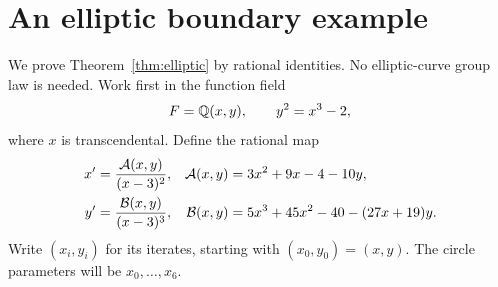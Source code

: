 \section{An elliptic boundary example}\label{sec:elliptic}

We prove Theorem~\ref{thm:elliptic} by rational identities. No
elliptic-curve group law is needed. Work first in the function field
\[
 F=\mathbb Q(x,y),\qquad y^2=x^3-2,
\]
where $x$ is transcendental. Define the rational map
\begin{equation}\label{eq:elliptic-map}
 \begin{aligned}
 x'&=\frac{\mathcal A(x,y)}{(x-3)^2},
 &\mathcal A(x,y)&=3x^2+9x-4-10y,\\
 y'&=\frac{\mathcal B(x,y)}{(x-3)^3},
 &\mathcal B(x,y)&=5x^3+45x^2-40-(27x+19)y.
 \end{aligned}
\end{equation}
Write $(x_i,y_i)$ for its iterates, starting with $(x_0,y_0)=(x,y)$.
The circle parameters will be $x_0,\ldots,x_6$.

